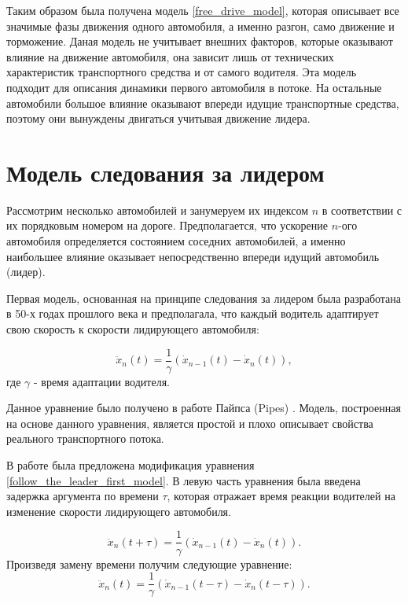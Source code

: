 \documentclass[12pt, a4paper]{extarticle}
\numberwithin{equation}{section}
\begin{document}
Таким образом была получена модель \eqref{free_drive_model}, которая описывает все значимые фазы движения одного автомобиля, а именно разгон, само движение и торможение. Даная модель не учитывает внешних факторов, которые оказывают влияние на движение автомобиля, она зависит лишь от технических характеристик транспортного средства и от самого водителя. Эта модель подходит для описания динамики первого автомобиля в потоке. На остальные автомобили большое влияние оказывают впереди идущие транспортные средства, поэтому они вынуждены двигаться учитывая движение лидера.

\section{Модель следования за лидером}

Рассмотрим несколько автомобилей и занумеруем их индексом $n$ в соответствии с их порядковым номером на дороге. Предполагается, что ускорение $n$-ого автомобиля определяется состоянием соседних автомобилей, а именно наибольшее влияние оказывает непосредственно впереди идущий автомобиль (лидер).

Первая модель, основанная на принципе следования за лидером была разработана в 50-х годах прошлого века и предполагала, что каждый водитель адаптирует свою скорость к скорости лидирующего автомобиля:

\begin{equation} \label{follow_the_leader_first_model}
\ddot{x}_n(t) = \dfrac{1}{\gamma} (\dot{x}_{n-1}(t) - \dot{x}_{n}(t)), 
\end{equation}
где $\gamma$ - время адаптации водителя.

Данное уравнение было получено в работе Пайпса (Pipes) \cite{FirstFollowTheLeaderModel}. Модель, построенная на основе данного уравнения, является простой и плохо описывает свойства реального транспортного потока.

В работе \cite{RefineFirstFollowTheLeaderModel} была предложена модификация уравнения \eqref{follow_the_leader_first_model}. В левую часть уравнения была введена задержка аргумента по времени $\tau$, которая отражает время реакции водителей на изменение скорости лидирующего автомобиля. 

\begin{equation*}
\ddot{x}_n(t+\tau) = \dfrac{1}{\gamma} (\dot{x}_{n-1}(t) - \dot{x}_{n}(t)).
\end{equation*}
Произведя замену времени получим следующие уравнение:
\begin{equation} \label{follow_the_leader_with_two_delay}
\ddot{x}_n(t) = \dfrac{1}{\gamma} (\dot{x}_{n-1}(t-\tau) - \dot{x}_{n}(t-\tau)).
\end{equation}
\end{document}
